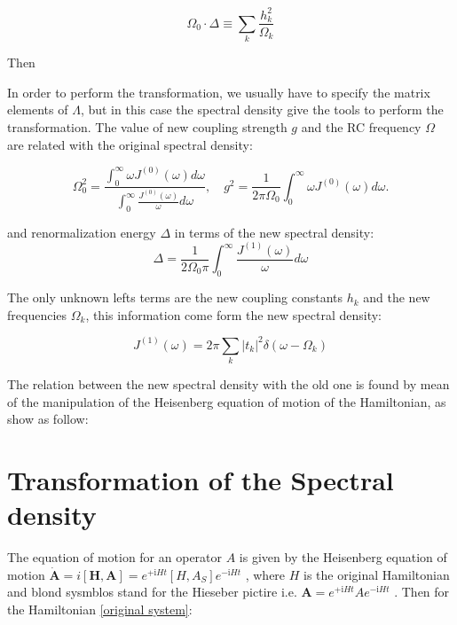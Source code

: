 \documentclass[%
preprint,
onecolumn,
notitlepag,
 amsmath,amssymb,
 aps,
 pra,
]{revtex4-2}
\begin{document}
\begin{equation}
\Omega_{0} \cdot \Delta \equiv \sum_{k} \frac{h_{k}^{2}}{\Omega_{k}}
\end{equation}

Then 

In order to perform the transformation, we usually have to specify the matrix elements of $\Lambda$, but in this case the spectral density give the tools to perform the transformation.  The value of new coupling strength  $g$  and the RC frequency  $\Omega$ are related with the original spectral density: 

\begin{equation}
\Omega_{0}^{2}=\frac{\int_{0}^{\infty} \omega J^{(0)}(\omega) d \omega}{\int_{0}^{\infty} \frac{J^{(0)}(\omega)}{\omega} d \omega}, \quad g^{2}=\frac{1}{2 \pi \Omega_{0}} \int_{0}^{\infty} \omega J^{(0)}(\omega) d \omega .
\end{equation}

and renormalization energy $\Delta$ in terms of the new spectral density: 
\begin{equation}
    \Delta =\frac{1}{2 \Omega_0 \pi} \int_{0}^{\infty} \frac{J^{(1)}(\omega)}{\omega} d \omega
\end{equation}

The only unknown lefts terms are the new coupling constants $h_k$ and the new frequencies $\Omega_k$, this information come form the new spectral density:

\begin{equation}
    J^{(1)} (\omega) =2 \pi \sum_k |t_k|^2 \delta(\omega-\Omega_k)
\end{equation}

The relation between  the new spectral density  with the old one is found by mean of the manipulation of the Heisenberg equation of motion of the Hamiltonian, as show as follow:

\section{Transformation of the Spectral density}

The equation of motion for an operator $A$ is given by the Heisenberg equation of motion $ \dot{\boldsymbol{A}} =i \left[ \boldsymbol{ H } , \boldsymbol{A} \right] =e^{+\mathrm{i} H t}\left[H, A_{S}\right] e^{-\mathrm{i} H t} $  , where $H$ is the original Hamiltonian and blond sysmblos stand for the Hieseber pictire i.e. $  \boldsymbol{ A } = e^{+\mathrm{i} H t} A e^{-\mathrm{i} H t} $ . Then for the Hamiltonian \eqref{original system}: 
\end{document}
